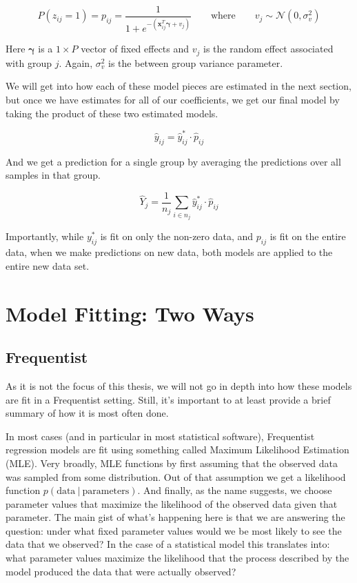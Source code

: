 \documentclass[12pt,twoside]{reedthesis}
\begin{document}
\[
P(z_{ij} = 1) = p_{ij} = \frac{1}{1 + e^{-(\mathbf{x}_{ij}^T\boldsymbol{\gamma} + v_j)}} \qquad \text{where} \qquad v_j \sim \mathcal{N}(0, \sigma_{v}^2)
\]

Here \(\boldsymbol{\gamma}\) is a \(1\times P\) vector of fixed effects and \(v_j\) is the random effect associated with group \(j\). Again, \(\sigma^2_{v}\) is the between group variance parameter.

We will get into how each of these model pieces are estimated in the next section, but once we have estimates for all of our coefficients, we get our final model by taking the product of these two estimated models.

\[
\hat{y}_{ij} = \hat{y}^*_{ij}\cdot \hat{p}_{ij}
\]

And we get a prediction for a single group by averaging the predictions over all samples in that group.

\[
\hat{Y}_j = \frac{1}{n_j}\sum_{i \in n_j}\hat{y}^*_{ij}\cdot \hat{p}_{ij}
\]

Importantly, while \(y^*_{ij}\) is fit on only the non-zero data, and \(p_{ij}\) is fit on the entire data, when we make predictions on new data, both models are applied to the entire new data set.

\hypertarget{twofits}{%
\section{Model Fitting: Two Ways}\label{twofits}}

\hypertarget{frequentist}{%
\subsection{Frequentist}\label{frequentist}}

As it is not the focus of this thesis, we will not go in depth into how these models are fit in a Frequentist setting. Still, it's important to at least provide a brief summary of how it is most often done.

In most cases (and in particular in most statistical software), Frequentist regression models are fit using something called Maximum Likelihood Estimation (MLE). Very broadly, MLE functions by first assuming that the observed data was sampled from some distribution. Out of that assumption we get a likelihood function \(p(\text{data} \ | \ \text{parameters})\). And finally, as the name suggests, we choose parameter values that maximize the likelihood of the observed data given that parameter. The main gist of what's happening here is that we are answering the question: under what fixed parameter values would we be most likely to see the data that we observed? In the case of a statistical model this translates into: what parameter values maximize the likelihood that the process described by the model produced the data that were actually observed?
\end{document}
